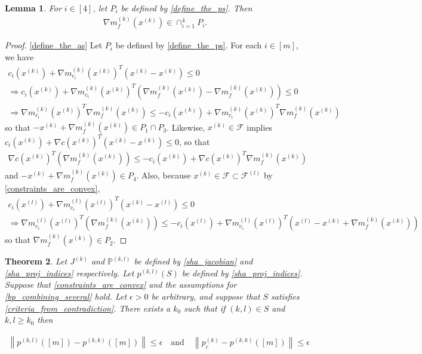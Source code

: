 \documentclass{article}
\newtheorem{theorem}{Theorem}[section]
\newtheorem{lemma}[theorem]{Lemma}
\theoremstyle{case}
\numberwithin{theorem}{subsection}
\newcommand{\feasiblel}{{\mathcal F^{(l)}}}
\newcommand{\feasible}{{\mathcal F}}
\newcommand{\gk}{{\nabla m_f^{(k)}\left(\xk\right)}}
\newcommand{\gmcik}{{\nabla m_{c_i}^{(k)}\left(\xk\right)}}
\newcommand{\gmcil}{{\nabla m_{c_i}^{(l)}\left(\xl\right)}}
\newcommand{\xk}{x^{(k)}}
\newcommand{\xl}{{x^{(l)}}}
\newcommand{\projkl}{{p^{(k,l)}}}
\newcommand{\projkk}{{p^{(k,k)}}}
\newcommand{\trueprojk}{{p_c^{(k)}}}
\newcommand{\activeprojkl}{{\mathbb P^{(k, l)}}}
\newcommand{\jackk}{{J^{(k)}}}
\begin{document}
\begin{lemma}
\label{the_gradient_is_in_em_all}
For $i \in [4]$, let $P_i$ be defined by \cref{define_the_ps}.
Then
\begin{align*}
\gk \in \cap_{i = 1}^4 P_i.
\end{align*}
\end{lemma}
\begin{proof}

\cref{define_the_as}
Let $P_i$ be defined by \cref{define_the_ps}.
For each $i \in [m]$, we have
\begin{align*}
c_i\left(\xk\right) + \gmcik^T \left(\xk - \xk\right)  \le 0 \\
\Longrightarrow c_i\left(\xk\right) + \gmcik^T \left(\gk - \gk \right)  \le 0 \\
\Longrightarrow \gmcik^T \gk  \le -c_i\left(\xk\right) + \gmcik^T\gk
\end{align*}
so that $-\xk + \gk \in P_1 \cap P_3$.
Likewise, $\xk \in \feasible$ implies $c_i\left(\xk\right) + \nabla c\left(\xk\right)^T \left(\xk-\xk\right)  \le 0$, so that
\begin{align*}
\nabla c\left(\xk\right)^T \left(\gk\right)  \le -c_i\left(\xk\right) + \nabla c\left(\xk\right)^T\gk
\end{align*}
and $-\xk + \gk \in P_4$.
Also, because $\xk \in \feasible \subset \feasiblel$ by \cref{constraints_are_convex},
\begin{align*}
c_i\left(\xl\right) + \gmcil^T \left(\xk - \xl\right) \le 0 \\
\Longrightarrow \gmcil^T \left(\gk\right) \le -c_i\left(\xl\right) + \gmcil^T\left(\xl - \xk + \gk\right)
\end{align*}
so that $\gk \in P_2$.
\end{proof}









\begin{theorem}
\label{bounded_projection_theorem}
Let $\jackk$ and $\activeprojkl$ be defined by \cref{sha_jacobian} and \cref{sha_proj_indices} respectively.
Let
$\projkl(S)$
be defined by
\cref{sha_proj_indices}.
Suppose that 
\cref{constraints_are_convex}
and the assumptions for
\cref{bp_combining_several}
hold.
Let $\epsilon > 0$ be arbitrary, and suppose that $S$ satisfies \cref{criteria_from_contradiction}.
There exists a $k_0$ such that if $(k, l) \in S$ and $k, l \ge k_0$ then

\begin{align*}
\left\| \projkl\left([m]\right) - \projkk\left([m]\right) \right\| \le \epsilon
\quad \textrm{and} \quad
\left\| \trueprojk - \projkk\left([m]\right) \right\| \le \epsilon
\end{align*}
\end{theorem}
\end{document}
